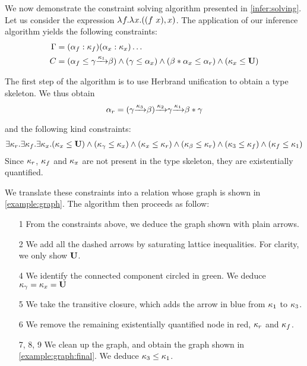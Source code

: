 We now demonstrate the constraint solving
algorithm presented in \cref{infer:solving}.
Let us consider the expression $\lambda^{{}} f.{\lambda^{{}} x.{((f\ x),x)}}$.
The application of our inference algorithm yields the following constraints:
%
\begin{align*}
  \Gamma &= (\alpha_f : \kappa_f)
  (\alpha_x : \kappa_x)\dots\\
  C &= (\alpha_f \leq \gamma {\xrightarrow{\kappa_1}} \beta )
  \wedge
  (\gamma \leq \alpha_x)
  \wedge
  (\beta * \alpha_x \leq \alpha_r)
  \wedge
  (\kappa_x \leq \mathbf{U})
\end{align*}

The first step of the algorithm is to use Herbrand unification to obtain
a type skeleton. We thus obtain
$$\alpha_r =
(\gamma {\xrightarrow{\kappa_3}} \beta) {\xrightarrow{\kappa_2}} \gamma {\xrightarrow{\kappa_1}} \beta * \gamma$$

and the following kind constraints: 
\begin{gather*}
  \exists \kappa_r.\exists \kappa_f.\exists \kappa_x.(\kappa_x \leq \mathbf{U})
  \wedge
  (\kappa_\gamma \leq \kappa_x)
  \wedge
  (\kappa_x \leq \kappa_r)
  \wedge
  (\kappa_\beta \leq \kappa_r)
  \wedge
  (\kappa_3 \leq \kappa_f)
  \wedge
  (\kappa_f \leq \kappa_1)
\end{gather*}
Since $\kappa_r$, $\kappa_f$ and $\kappa_x$ are not present in the type skeleton,
they are existentially quantified.

We translate these constraints into a relation whose graph
is shown in \cref{example:graph}.
%
The algorithm then proceeds as follow:
\begin{itemize}[noitemsep]
\item[1] From the constraints above, we deduce the graph shown
  with plain arrows.
\item[2] We add all the dashed arrows by saturating
  lattice inequalities. For clarity, we only show $\mathbf{U}$.
\item[4] We identify the connected component circled in
  {\color{green} green}.
  We deduce $\kappa_\gamma = \kappa_x = \mathbf{U}$
\item[5] We take the transitive closure, which adds the
  arrow in {\color{blue} blue} from $\kappa_1$ to $\kappa_3$.
\item[6] We remove the remaining existentially quantified node in {\color{red} red}, $\kappa_r$ and $\kappa_f$.
\item[7, 8, 9] We clean up the graph, and obtain the graph shown
  in \cref{example:graph:final}.
  We deduce $\kappa_3 \leq \kappa_1$.
\end{itemize}

